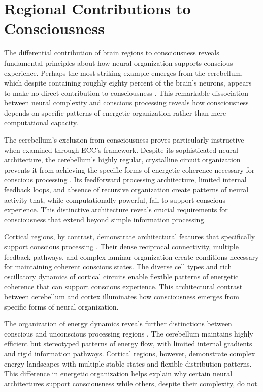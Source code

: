 \section{Regional Contributions to Consciousness}

The differential contribution of brain regions to consciousness reveals fundamental principles about how neural organization supports conscious experience. Perhaps the most striking example emerges from the cerebellum, which despite containing roughly eighty percent of the brain's neurons, appears to make no direct contribution to consciousness \cite{Herculano-Houzel2010}. This remarkable dissociation between neural complexity and conscious processing reveals how consciousness depends on specific patterns of energetic organization rather than mere computational capacity.

The cerebellum's exclusion from consciousness proves particularly instructive when examined through ECC's framework. Despite its sophisticated neural architecture, the cerebellum's highly regular, crystalline circuit organization prevents it from achieving the specific forms of energetic coherence necessary for conscious processing \cite{Ito2008}. Its feedforward processing architecture, limited internal feedback loops, and absence of recursive organization create patterns of neural activity that, while computationally powerful, fail to support conscious experience. This distinctive architecture reveals crucial requirements for consciousness that extend beyond simple information processing.

Cortical regions, by contrast, demonstrate architectural features that specifically support conscious processing \cite{Fox2005}. Their dense reciprocal connectivity, multiple feedback pathways, and complex laminar organization create conditions necessary for maintaining coherent conscious states. The diverse cell types and rich oscillatory dynamics of cortical circuits enable flexible patterns of energetic coherence that can support conscious experience. This architectural contrast between cerebellum and cortex illuminates how consciousness emerges from specific forms of neural organization.

The organization of energy dynamics reveals further distinctions between conscious and unconscious processing regions \cite{Dehaene2006}. The cerebellum maintains highly efficient but stereotyped patterns of energy flow, with limited internal gradients and rigid information pathways. Cortical regions, however, demonstrate complex energy landscapes with multiple stable states and flexible distribution patterns. This difference in energetic organization helps explain why certain neural architectures support consciousness while others, despite their complexity, do not.

